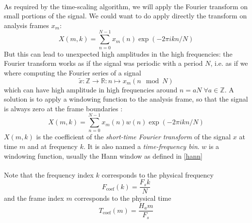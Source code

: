 \documentclass[letterpaper]{article}
\theoremstyle{definition}
\theoremstyle{remark}
\theoremstyle{plain}
\begin{document}
\paragraph{}
As required by the time-scaling algorithm, we will apply the Fourier transform
on small portions of the signal. We could want to do apply directly the
transform on analysis frames \(x_m\):
\begin{equation*}
X(m,k)=\sum_{n=0}^{N-1}x_m(n)\exp(-2\pi ikn/N)
\end{equation*}
But this can lead to unexpected high amplitudes in the high frequencies:
the Fourier transform works as if the signal was periodic with a period \(N\),
i.e. as if we where computing the Fourier series of a signal
\begin{equation}
\tilde x:\mathbb{Z}\to\mathbb{R}:n\mapsto x_m(n\mod N)
\end{equation}
which can have high amplitude in high frequencies around
\(n=aN\;\forall a\in\mathbb{Z}\).
A solution is to apply a windowing function to the analysis frame, so that the
signal is always zero at the frame boundaries \citep{gabor1946theory}:
\begin{equation}
    X(m,k) = \sum_{n=0}^{N-1}x_m(n)w(n)\exp(-2\pi ikn/N)
\end{equation}
\(X(m,k)\) is the coefficient of the \emph{short-time Fourier transform} of
the signal \(x\) at time \(m\) and at frequency \(k\). It is also named a
\emph{time-frequency bin}. \(w\) is a windowing function, usually the Hann
window as defined in \eqref{hann}

\paragraph{}
Note that the frequency index \(k\) corresponds to the physical frequency
\begin{equation}
		\label{frequency_index}
    F_{\text{coef}}(k) = \frac{F_s k}{N}
\end{equation}
and the frame index \(m\) corresponds to the physical time
\begin{equation}
    T_{\text{coef}}(m) = \frac{H_a m}{F_s}
\end{equation}
\end{document}
